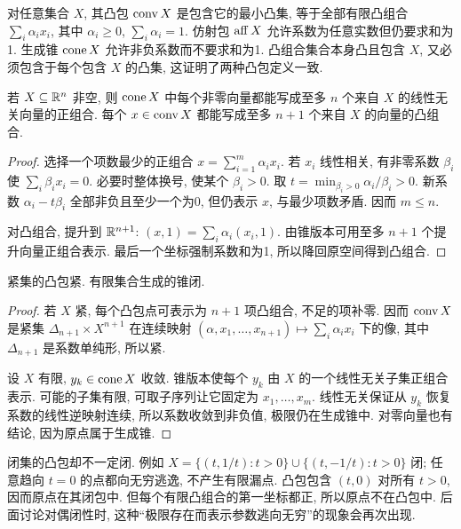 对任意集合 $X$, 其凸包 $\operatorname{conv} X$ 是包含它的最小凸集, 等于全部有限凸组合 $\sum_i\alpha_i x_i$, 其中 $\alpha_i\ge0$, $\sum_i\alpha_i=1$. 仿射包 $\operatorname{aff} X$ 允许系数为任意实数但仍要求和为1. 生成锥 $\operatorname{cone} X$ 允许非负系数而不要求和为1. 凸组合集合本身凸且包含 $X$, 又必须包含于每个包含 $X$ 的凸集, 这证明了两种凸包定义一致.

\begin{theorem}[Carathéodory 定理]\label{thm:caratheodory}
若 $X\subseteq\mathbb R^n$ 非空, 则 $\operatorname{cone} X$ 中每个非零向量都能写成至多 $n$ 个来自 $X$ 的线性无关向量的正组合. 每个 $x\in\operatorname{conv} X$ 都能写成至多 $n+1$ 个来自 $X$ 的向量的凸组合.
\end{theorem}
\begin{proof}
选择一个项数最少的正组合 $x=\sum_{i=1}^m\alpha_i x_i$. 若 $x_i$ 线性相关, 有非零系数 $\beta_i$ 使 $\sum_i\beta_i x_i=0$. 必要时整体换号, 使某个 $\beta_i>0$. 取 $t=\min_{\beta_i>0}\alpha_i/\beta_i>0$. 新系数 $\alpha_i-t\beta_i$ 全部非负且至少一个为0, 但仍表示 $x$, 与最少项数矛盾. 因而 $m\le n$.

对凸组合, 提升到 $\mathbb R^{n+1}$: $ (x,1)=\sum_i\alpha_i(x_i,1)$. 由锥版本可用至多 $n+1$ 个提升向量正组合表示. 最后一个坐标强制系数和为1, 所以降回原空间得到凸组合.
\end{proof}
\begin{corollary}
紧集的凸包紧. 有限集合生成的锥闭.
\end{corollary}
\begin{proof}
若 $X$ 紧, 每个凸包点可表示为 $n+1$ 项凸组合, 不足的项补零. 因而 $\operatorname{conv} X$ 是紧集 $\Delta_{n+1}\times X^{n+1}$ 在连续映射 $(\alpha,x_1,\ldots,x_{n+1})\mapsto\sum_i\alpha_ix_i$ 下的像, 其中 $\Delta_{n+1}$ 是系数单纯形, 所以紧.

设 $X$ 有限, $y_k\in\operatorname{cone} X$ 收敛. 锥版本使每个 $y_k$ 由 $X$ 的一个线性无关子集正组合表示. 可能的子集有限, 可取子序列让它固定为 $x_1,\ldots,x_m$. 线性无关保证从 $y_k$ 恢复系数的线性逆映射连续, 所以系数收敛到非负值, 极限仍在生成锥中. 对零向量也有结论, 因为原点属于生成锥.
\end{proof}
闭集的凸包却不一定闭. 例如 $X=\{(t,1/t):t>0\}\cup\{(t,-1/t):t>0\}$ 闭; 任意趋向 $t=0$ 的点都向无穷逃逸, 不产生有限漏点. 凸包包含 $(t,0)$ 对所有 $t>0$, 因而原点在其闭包中. 但每个有限凸组合的第一坐标都正, 所以原点不在凸包中. 后面讨论对偶闭性时, 这种“极限存在而表示参数逃向无穷”的现象会再次出现.
